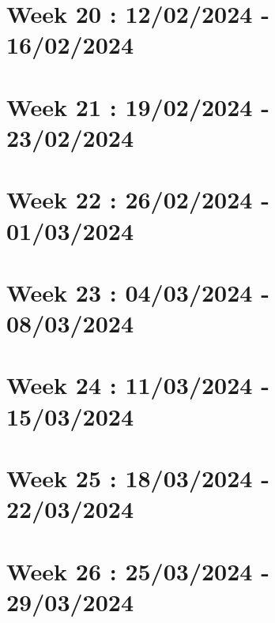 \documentclass[french]{article}
\begin{document}
	\section{Week 20 : 12/02/2024 - 16/02/2024}
	

	\section{Week 21 : 19/02/2024 - 23/02/2024}
	

	\section{Week 22 : 26/02/2024 - 01/03/2024}
	

	\section{Week 23 : 04/03/2024 - 08/03/2024}
	

	\section{Week 24 : 11/03/2024 - 15/03/2024}
	

	\section{Week 25 : 18/03/2024 - 22/03/2024}
	

	\section{Week 26 : 25/03/2024 - 29/03/2024}
\end{document}
